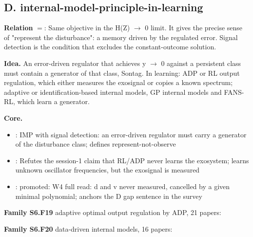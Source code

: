 \documentclass[10pt]{article}
\newcommand{\memb}[1]{\par\smallskip\textbf{#1}\quad}
\begin{document}
\subsection{D. internal-model-principle-in-learning}\label{node:S6-S6-D-internal-model-principle-in-learning}
\textbf{Relation} $=$: Same objective in the H(Z) \ensuremath{\to} 0 limit. It gives the precise sense of "represent the disturbance": a memory driven by the regulated error. Signal detection is the condition that excludes the constant-outcome solution.

\textbf{Idea.} An error-driven regulator that achieves y \ensuremath{\to} 0 against a persistent class must contain a generator of that class, Sontag. In learning: ADP or RL output regulation, which either measures the exosignal or copies a known spectrum; adaptive or identification-based internal models, GP internal models and FANS-RL, which learn a generator.

\memb{Core.}
\begin{itemize}[nosep,leftmargin=1.2em]
\item \citet{Sontag-adaptation03}: IMP with signal detection: an error-driven regulator must carry a generator of the disturbance class; defines represent-not-observe
\item \citet{Qasem-adaptive22}: Refutes the session-1 claim that RL/ADP never learns the exosystem; learns unknown oscillator frequencies, but the exosignal is measured
\item \citet{Zhao-incremental24}: promoted: W4 full read: d and v never measured, cancelled by a given minimal polynomial; anchors the D gap sentence in the survey
\end{itemize}
\memb{Family S6.F19} adaptive optimal output regulation by ADP, 21 papers: {\footnotesize \citetext{\citealp{Qasem-adaptive22}; \citealp{Zhao-incremental24}; \citealp{Gao-adaptive16}; \citealp{Chen-robust21}; \citealp{Rizvi-reinforcement22}; \citealp{Qasem-autonomous23}; \citealp{Jing-incremental25}; \citealp{Gao-learningbased18}; \citealp{Liu-adaptive18}; \citealp{Jiang-learningbased20}; \citealp{Gao-learningbased22}; \citealp{Gao-reinforcement22}; \citealp{Xie-optimal22}; \citealp{Alsalti-efficient23}; \citealp{Amirparast-undiscounted23}; \citealp{Cotta-control23}; \citealp{Jiang-adpbased23}; \citealp{Gao-resilient24}; \citealp{Wang-adaptive24}; \citealp{Lin-datadriven25b}; \citealp{Lin-direct25}}}

\memb{Family S6.F20} data-driven internal models, 16 papers: {\footnotesize \citetext{\citealp{Lin-datadriven24}; \citealp{Liu-datadriven25b}; \citealp{Nikiforov-adaptive98}; \citealp{Bin-adaptive19}; \citealp{Bin-about20}; \citealp{Bin-approximate21}; \citealp{Gentilini-adaptive22}; \citealp{Gentilini-datadriven22}; \citealp{Chen-datadriven23}; \citealp{Deutscher-datadriven24}; \citealp{Wang-nonparametric24}; \citealp{Zhu-data24}; \citealp{Harry-datadriven25}; \citealp{Mengozzi-physicsinformed25}; \citealp{Xu-online25}; \citealp{Wang-nonadaptive26}}}
\end{document}
